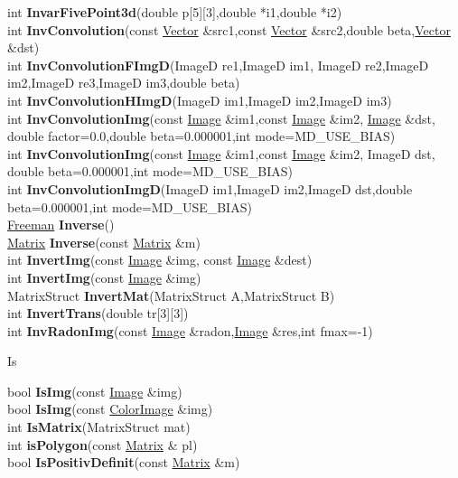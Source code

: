 \documentclass[10pt,titlepage]{article}
\def\functionlistentry#1#2#3#4#5#6{\noindent #1 {\bf #2}(#3) \dotfill #6\\}
\def\letterref#1{}
\def\letterlabel#1{\vspace{0.5cm}\centerline{\Large #1}}
\def\letterlabelend#1{}
\begin{document}
{{\functionlistentry{int}{InvarFivePoint3d}{double p[5][3],double *i1,double *i2}{1392}{numeric}{}
\functionlistentry{int}{InvConvolution}{const \hyperlink{Vector}{Vector} \&src1,const \hyperlink{Vector}{Vector} \&src2,double beta,\hyperlink{Vector}{Vector} \&dst}{1217}{signalTrafo}{}
\functionlistentry{int}{InvConvolutionFImgD}{ImageD re1,ImageD im1, ImageD re2,ImageD im2,ImageD re3,ImageD im3,double beta}{1219}{signalTrafo}{}
\functionlistentry{int}{InvConvolutionHImgD}{ImageD im1,ImageD im2,ImageD im3}{1220}{signalTrafo}{}
\functionlistentry{int}{InvConvolutionImg}{const \hyperlink{Image}{Image} \&im1,const \hyperlink{Image}{Image} \&im2, \hyperlink{Image}{Image} \&dst, double factor=0.0,double beta=0.000001,int mode=MD\_USE\_BIAS}{1221}{signalTrafo}{}
\functionlistentry{int}{InvConvolutionImg}{const \hyperlink{Image}{Image} \&im1,const \hyperlink{Image}{Image} \&im2, ImageD dst, double beta=0.000001,int mode=MD\_USE\_BIAS}{1222}{signalTrafo}{}
\functionlistentry{int}{InvConvolutionImgD}{ImageD im1,ImageD im2,ImageD dst,double beta=0.000001,int mode=MD\_USE\_BIAS}{1218}{signalTrafo}{}
\functionlistentry{\hyperlink{Freeman}{Freeman}}{Inverse}{}{473}{conturs}{}
\functionlistentry{\hyperlink{Matrix}{Matrix}}{Inverse}{const \hyperlink{Matrix}{Matrix} \&m}{1114}{matrixAlgebra}{}
\functionlistentry{int}{InvertImg}{const \hyperlink{Image}{Image} \&img, const \hyperlink{Image}{Image} \&dest}{1092}{processing}{}
\functionlistentry{int}{InvertImg}{const \hyperlink{Image}{Image} \&img}{1093}{processing}{}
\functionlistentry{MatrixStruct}{InvertMat}{MatrixStruct A,MatrixStruct B}{1582}{obsolet}{}
\functionlistentry{int}{InvertTrans}{double tr[3][3]}{1588}{obsolet}{}
\functionlistentry{int}{InvRadonImg}{const \hyperlink{Image}{Image} \&radon,\hyperlink{Image}{Image} \&res,int fmax=-1}{1232}{signalTrafo}{}

\letterlabel{Is}
\letterref{A}
\letterref{B}
\letterref{C}
\letterref{D}
\letterref{E}
\letterref{F}
\letterref{G}
\letterref{H}
\letterref{I}
\letterref{K}
\letterref{L}
\letterref{M}
\letterref{N}
\letterref{O}
\letterref{P}
\letterref{Q}
\letterref{R}
\letterref{S}
\letterref{T}
\letterref{U}
\letterref{V}
\letterref{W}
\letterref{X}
\letterref{Y}
\letterref{Z}

\letterref{If}
\letterref{Im}
\letterref{In}
\letterref{Is}
\letterlabelend{Is}
\functionlistentry{bool}{IsImg}{const \hyperlink{Image}{Image} \&img}{14}{Images}{}
\functionlistentry{bool}{IsImg}{const \hyperlink{ColorImage}{ColorImage} \&img}{26}{Images}{}
\functionlistentry{int}{IsMatrix}{MatrixStruct mat}{1577}{obsolet}{}
\functionlistentry{int}{isPolygon}{const \hyperlink{Matrix}{Matrix} \& pl}{279}{datastructures}{}
\functionlistentry{bool}{IsPositivDefinit}{const \hyperlink{Matrix}{Matrix} \&m}{1117}{matrixAlgebra}{}

}}
\end{document}
